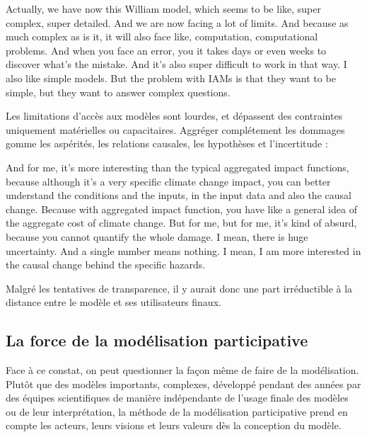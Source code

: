 \begin{authoredquote}
    Actually, we have now this William model, which seems to be like,  super complex, super detailed. And we are now facing a lot of limits. And because as much complex as is it, it will also face like, computation, computational problems. And when  you face an error, you it takes days or even weeks to discover what's the mistake. And it's also super difficult to work in that way. I also like simple models. But the problem with IAMs is that they want to be simple, but they want to answer complex questions.
\end{authoredquote}

Les limitations d'accès aux modèles sont lourdes, et dépassent des contraintes uniquement matérielles ou capacitaires. Aggréger complétement les dommages gomme les aspérités, les relations causales, les hypothèses et l'incertitude : 

\begin{authoredquote}
    And for me, it's more interesting than the typical aggregated impact functions, because although it's a very specific climate change impact, you can better understand the conditions and the inputs, in the input data and also the causal change. Because with aggregated impact function, you have like a general idea of the aggregate cost of climate change. But for me, but for me, it's kind of absurd, because you cannot quantify the whole damage. I mean, there is huge uncertainty. And a single number means nothing. I mean, I am more interested in the causal change behind the specific hazards.
\end{authoredquote}


Malgré les tentatives de transparence, il y aurait donc une part irréductible à la distance entre le modèle et ses utilisateurs finaux. 




\subsection{La force de la modélisation participative}

Face à ce constat, on peut questionner la façon même de faire de la modélisation. Plutôt que des modèles importants, complexes, développé pendant des années par des équipes scientifiques de manière indépendante de l'usage finale des modèles ou de leur interprétation, la méthode de la modélisation participative prend en compte les acteurs, leurs visions et leurs valeurs dès la conception du modèle. \\

